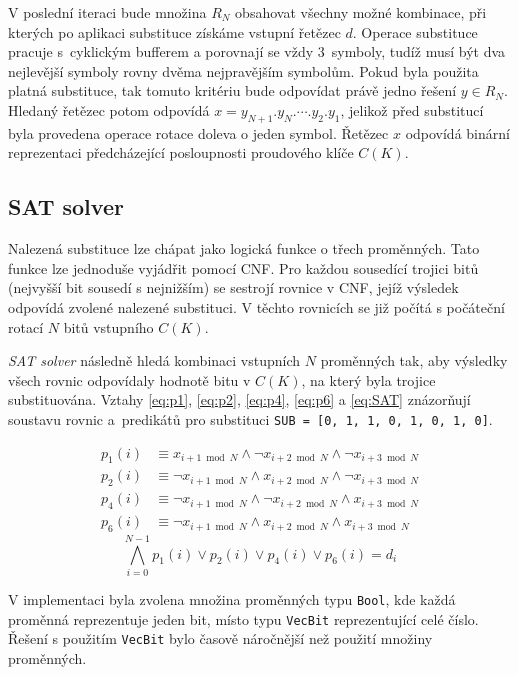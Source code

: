 \documentclass[11pt,a4paper]{article}
\begin{document}
V poslední iteraci bude množina $R_N$ obsahovat všechny možné kombinace, při kterých po aplikaci substituce získáme vstupní řetězec $d$. Operace substituce pracuje s~cyklickým bufferem a porovnají se vždy 3~symboly, tudíž musí být dva nejlevější symboly rovny dvěma nejpravějším symbolům. Pokud byla použita platná substituce, tak tomuto kritériu bude odpovídat právě jedno řešení $y \in R_N$.  Hledaný řetězec potom odpovídá $x = y_{N+1}.y_N. \cdots .y_2.y_1$, jelikož před substitucí byla provedena operace rotace doleva o jeden symbol. Řetězec $x$ odpovídá binární reprezentaci předcházející posloupnosti proudového klíče $C(K)$.


\subsection{SAT solver}

Nalezená substituce lze chápat jako logická funkce o třech proměnných. Tato funkce lze jednoduše vyjádřit pomocí CNF. Pro každou sousedící trojici bitů (nejvyšší bit sousedí s nejnižším) se sestrojí rovnice v CNF, jejíž výsledek odpovídá zvolené nalezené substituci. V těchto rovnicích se již počítá s počáteční rotací $N$ bitů vstupního $C(K)$.

\emph{SAT solver} následně hledá kombinaci vstupních $N$ proměnných tak, aby výsledky všech rovnic odpovídaly hodnotě bitu v $C(K)$, na který byla trojice substituována. Vztahy \ref{eq:p1}, \ref{eq:p2}, \ref{eq:p4}, \ref{eq:p6} a \ref{eq:SAT} znázorňují soustavu rovnic a~predikátů pro substituci \texttt{SUB = [0, 1, 1, 0, 1, 0, 1, 0]}.

\begin{align}\label{eq:p1}
	p_1(i) &\equiv x_{i+1\bmod N} \wedge \neg x_{i+2\bmod N}  \wedge \neg x_{i+3\bmod N} \\\label{eq:p2}
	p_2(i) &\equiv \neg x_{i+1\bmod N} \wedge x_{i+2\bmod N}  \wedge \neg x_{i+3\bmod N} \\\label{eq:p4}
	p_4(i) &\equiv \neg x_{i+1\bmod N} \wedge \neg x_{i+2\bmod N}  \wedge x_{i+3\bmod N} \\\label{eq:p6}
	p_6(i) &\equiv \neg x_{i+1\bmod N} \wedge x_{i+2\bmod N}  \wedge x_{i+3\bmod N}
\end{align}
\begin{equation}\label{eq:SAT}
\bigwedge_{i=0}^{N-1} p_1(i) \vee p_2(i) \vee p_4(i) \vee p_6(i) = d_i
\end{equation}

V implementaci byla zvolena množina proměnných typu \texttt{Bool}, kde každá proměnná reprezentuje jeden bit, místo typu \texttt{VecBit} reprezentující celé číslo. Řešení s použitím \texttt{VecBit} bylo časově náročnější než použití množiny proměnných.
\end{document}
